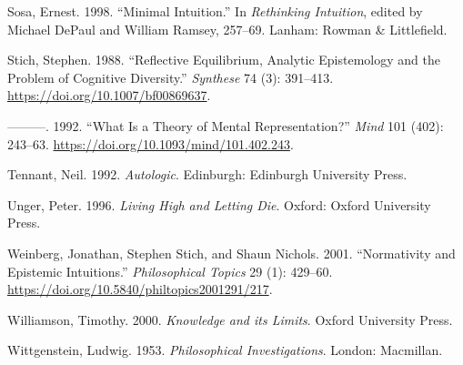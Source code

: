 \documentclass[
  11pt,
  letterpaper,
  DIV=11,
  numbers=noendperiod,
  oneside]{scrartcl}
\newlength{\cslhangindent}
\newenvironment{CSLReferences}[2] %
 {\begin{list}{}{%
  \setlength{\itemindent}{0pt}
  \setlength{\leftmargin}{0pt}
  \setlength{\parsep}{0pt}
  \ifodd #1
   \setlength{\leftmargin}{\cslhangindent}
   \setlength{\itemindent}{-1\cslhangindent}
  \fi
  \setlength{\itemsep}{#2\baselineskip}}}
 {\end{list}}
\begin{document}
\begin{CSLReferences}{1}{0}
Sosa, Ernest. 1998. {``Minimal Intuition.''} In \emph{Rethinking
Intuition}, edited by Michael DePaul and William Ramsey, 257--69.
Lanham: Rowman \& Littlefield.

Stich, Stephen. 1988. {``Reflective Equilibrium, Analytic Epistemology
and the Problem of Cognitive Diversity.''} \emph{Synthese} 74 (3):
391--413. \url{https://doi.org/10.1007/bf00869637}.

---------. 1992. {``What Is a Theory of Mental Representation?''}
\emph{Mind} 101 (402): 243--63.
\url{https://doi.org/10.1093/mind/101.402.243}.

Tennant, Neil. 1992. \emph{Autologic}. Edinburgh: Edinburgh University
Press.

Unger, Peter. 1996. \emph{Living High and Letting Die}. Oxford: Oxford
University Press.

Weinberg, Jonathan, Stephen Stich, and Shaun Nichols. 2001.
{``Normativity and Epistemic Intuitions.''} \emph{Philosophical Topics}
29 (1): 429--60. \url{https://doi.org/10.5840/philtopics2001291/217}.

Williamson, Timothy. 2000. \emph{{Knowledge and its Limits}}. Oxford
University Press.

Wittgenstein, Ludwig. 1953. \emph{Philosophical Investigations}. London:
Macmillan.

\end{CSLReferences}
\end{document}
